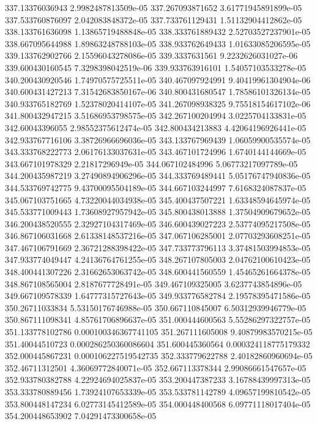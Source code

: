 {337.13376036943 2.9982487813509e-05
337.267093871652 3.61771945891899e-05
337.533760876097 2.042083848372e-05
337.733761129431 1.51132904412862e-05
338.133761636098 1.13865719488848e-05
338.333761889432 2.52703527237901e-05
338.667095644988 1.89863248788103e-05
338.933762649433 1.01633085206595e-05
339.133762902766 2.15596043278086e-05
339.3337631561 9.2232626031027e-06
339.600430160545 7.3298398042519e-06
339.933763916101 1.54057103533278e-05
340.200430920546 1.74970575725511e-05
340.467097924991 9.40419961304904e-06
340.600431427213 7.31542683850167e-06
340.800431680547 1.78586101326134e-05
340.933765182769 1.52378020414107e-05
341.267098938325 9.75518154617102e-06
341.800432947215 3.51686953798575e-05
342.267100204994 3.0225704133831e-05
342.60043396055 2.98552375612474e-05
342.800434213883 4.42064196926441e-05
342.933767716106 3.38726966696036e-05
343.133767969439 1.06059900535574e-05
343.333768222773 2.06176133037631e-05
343.467101724996 1.6740144144669e-05
343.667101978329 2.21817296949e-05
344.067102484996 5.06773217097789e-05
344.200435987219 3.27490894906296e-05
344.333769489441 5.05176747940836e-05
344.533769742775 9.43700095504189e-05
344.667103244997 7.6168324087837e-05
345.067103751665 4.73220044034938e-05
345.400437507221 1.63348594645974e-05
345.533771009443 1.73608927957942e-05
345.800438013888 1.37504909679652e-05
346.200438520555 2.32927104317469e-05
346.600439027223 2.53774095217508e-05
346.867106031668 2.61338148537216e-05
347.067106285001 2.07703293608251e-05
347.467106791669 2.36721288398422e-05
347.733773796113 3.37481503994853e-05
347.933774049447 4.24136764761255e-05
348.267107805003 2.04762100610423e-05
348.400441307226 2.31662653063742e-05
348.600441560559 1.45465261664378e-05
348.867108565004 2.8187677728491e-05
349.467109325005 3.6237743854896e-05
349.667109578339 1.64777315727643e-05
349.933776582784 2.19578395471586e-05
350.26711033834 5.53150176746988e-05
350.667110845007 6.50312939946779e-05
350.867111098341 4.85761706896637e-05
351.000444600563 5.55286297322757e-05
351.133778102786 0.000100346367741105
351.267111605008 9.40879983570215e-05
351.40044510723 0.000286250360086604
351.600445360564 0.000324118775179332
352.000445867231 0.000106227519542735
352.333779622788 2.40182860960694e-05
352.46711312501 4.36069772840071e-05
352.667113378344 2.99086661547657e-05
352.933780382788 4.22924694025837e-05
353.200447387233 3.16788439997313e-05
353.333780889456 1.73924107653339e-05
353.533781142789 4.09657199810542e-05
353.800448147234 6.02773145412589e-05
354.000448400568 6.09771118017404e-05
354.200448653902 7.04291473300658e-05
}
